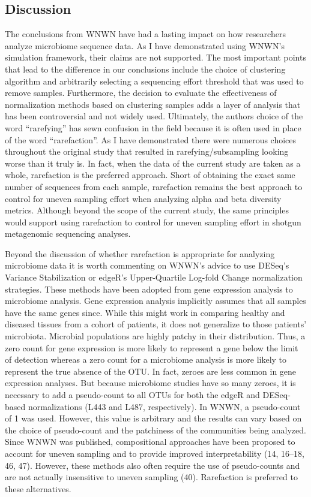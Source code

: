 \documentclass[
]{article}
\begin{document}
\hypertarget{discussion}{%
\subsection{Discussion}\label{discussion}}

The conclusions from WNWN have had a lasting impact on how researchers
analyze microbiome sequence data. As I have demonstrated using WNWN's
simulation framework, their claims are not supported. The most important
points that lead to the difference in our conclusions include the choice
of clustering algorithm and arbitrarily selecting a sequencing effort
threshold that was used to remove samples. Furthermore, the decision to
evaluate the effectiveness of normalization methods based on clustering
samples adds a layer of analysis that has been controversial and not
widely used. Ultimately, the authors choice of the word ``rarefying''
has sewn confusion in the field because it is often used in place of the
word ``rarefaction''. As I have demonstrated there were numerous choices
throughout the original study that resulted in rarefying/subsampling
looking worse than it truly is. In fact, when the data of the current
study are taken as a whole, rarefaction is the preferred approach. Short
of obtaining the exact same number of sequences from each sample,
rarefaction remains the best approach to control for uneven sampling
effort when analyzing alpha and beta diversity metrics. Although beyond
the scope of the current study, the same principles would support using
rarefaction to control for uneven sampling effort in shotgun metagenomic
sequencing analyses.

Beyond the discussion of whether rarefaction is appropriate for
analyzing microbiome data it is worth commenting on WNWN's advice to use
DESeq's Variance Stabilization or edgeR's Upper-Quartile Log-fold Change
normalization strategies. These methods have been adopted from gene
expression analysis to microbiome analysis. Gene expression analysis
implicitly assumes that all samples have the same genes since. While
this might work in comparing healthy and diseased tissues from a cohort
of patients, it does not generalize to those patients' microbiota.
Microbial populations are highly patchy in their distribution. Thus, a
zero count for gene expression is more likely to represent a gene below
the limit of detection whereas a zero count for a microbiome analysis is
more likely to represent the true absence of the OTU. In fact, zeroes
are less common in gene expression analyses. But because microbiome
studies have so many zeroes, it is necessary to add a pseudo-count to
all OTUs for both the edgeR and DESeq-based normalizations (L443 and
L487, respectively). In WNWN, a pseudo-count of 1 was used. However,
this value is arbitrary and the results can vary based on the choice of
pseudo-count and the patchiness of the communities being analyzed. Since
WNWN was published, compositional approaches have been proposed to
account for uneven sampling and to provide improved interpretability
(14, 16--18, 46, 47). However, these methods also often require the use
of pseudo-counts and are not actually insensitive to uneven sampling
(40). Rarefaction is preferred to these alternatives.
\end{document}
